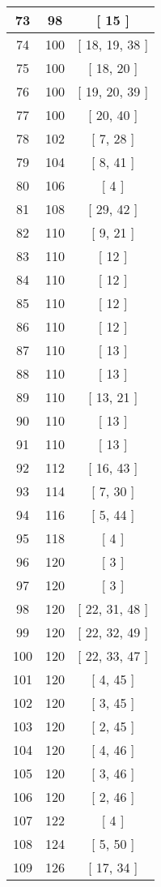 \begin{center}
\begin{longtable}[H]{|| c c c ||}
\hline
73 & 98 & [ 15 ] \\ 
\hline
74 & 100 & [ 18, 19, 38 ] \\ 
\hline
75 & 100 & [ 18, 20 ] \\ 
\hline
76 & 100 & [ 19, 20, 39 ] \\ 
\hline
77 & 100 & [ 20, 40 ] \\ 
\hline
78 & 102 & [ 7, 28 ] \\ 
\hline
79 & 104 & [ 8, 41 ] \\ 
\hline
80 & 106 & [ 4 ] \\ 
\hline
81 & 108 & [ 29, 42 ] \\ 
\hline
82 & 110 & [ 9, 21 ] \\ 
\hline
83 & 110 & [ 12 ] \\ 
\hline
84 & 110 & [ 12 ] \\ 
\hline
85 & 110 & [ 12 ] \\ 
\hline
86 & 110 & [ 12 ] \\ 
\hline
87 & 110 & [ 13 ] \\ 
\hline
88 & 110 & [ 13 ] \\ 
\hline
89 & 110 & [ 13, 21 ] \\ 
\hline
90 & 110 & [ 13 ] \\ 
\hline
91 & 110 & [ 13 ] \\ 
\hline
92 & 112 & [ 16, 43 ] \\ 
\hline
93 & 114 & [ 7, 30 ] \\ 
\hline
94 & 116 & [ 5, 44 ] \\ 
\hline
95 & 118 & [ 4 ] \\ 
\hline
96 & 120 & [ 3 ] \\ 
\hline
97 & 120 & [ 3 ] \\ 
\hline
98 & 120 & [ 22, 31, 48 ] \\ 
\hline
99 & 120 & [ 22, 32, 49 ] \\ 
\hline
100 & 120 & [ 22, 33, 47 ] \\ 
\hline
101 & 120 & [ 4, 45 ] \\ 
\hline
102 & 120 & [ 3, 45 ] \\ 
\hline
103 & 120 & [ 2, 45 ] \\ 
\hline
104 & 120 & [ 4, 46 ] \\ 
\hline
105 & 120 & [ 3, 46 ] \\ 
\hline
106 & 120 & [ 2, 46 ] \\ 
\hline
107 & 122 & [ 4 ] \\ 
\hline
108 & 124 & [ 5, 50 ] \\ 
\hline
109 & 126 & [ 17, 34 ] \\ 

\end{longtable}
\end{center}
